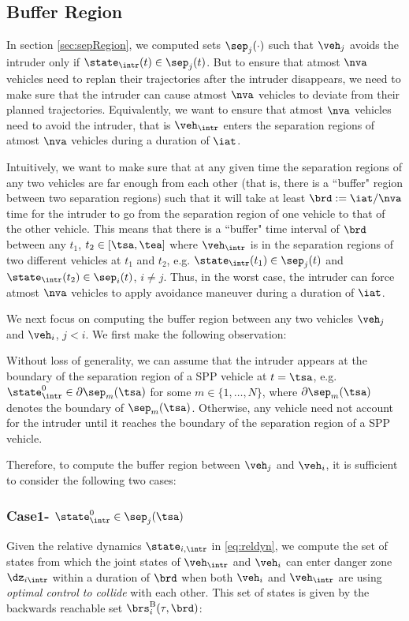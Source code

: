 \subsection{Buffer Region} \label{sec:buffRegion}
In section \ref{sec:sepRegion}, we computed sets $\sep_j(\cdot)$ such that $\veh_j$ avoids the intruder only if $\state_{\intr}(t) \in \sep_j(t)$. But to ensure that atmost $\nva$ vehicles need to replan their trajectories after the intruder disappears, we need to make sure that the intruder can cause atmost $\nva$ vehicles to deviate from their planned trajectories. Equivalently, we want to ensure that atmost $\nva$ vehicles need to avoid the intruder, that is $\veh_{\intr}$ enters the separation regions of atmost $\nva$ vehicles during a duration of $\iat$.

Intuitively, we want to make sure that at any given time the separation regions of any two vehicles are far enough from each other (that is, there is a ``buffer" region between two separation regions) such that it will take at least $\brd := \iat / \nva$ time for the intruder to go from the separation region of one vehicle to that of the other vehicle. This means that there is a ``buffer" time interval of $\brd$ between any $t_1$, $t_2 \in [\tsa, \tea]$ where $\veh_{\intr}$ is in the separation regions of two different vehicles at $t_1$ and $t_2$, e.g. $\state_{\intr}(t_1) \in \sep_j(t)$ and $\state_{\intr}(t_2) \in \sep_i(t)$, $i \neq j$. Thus, in the worst case, the intruder can force atmost $\nva$ vehicles to apply avoidance maneuver during a duration of $\iat$. 

We next focus on computing the buffer region between any two vehicles $\veh_j$ and $\veh_i$, $j < i$. We first make the following observation:
\begin{observation} \label{obs1_buffReg}
Without loss of generality, we can assume that the intruder appears at the boundary of the separation region of a SPP vehicle at $t = \tsa$, e.g. $\state_{\intr}^0 \in \partial \sep_m(\tsa)$ for some $m \in \{1, \ldots, N\}$, where $\partial \sep_m(\tsa)$ denotes the boundary of $\sep_m(\tsa)$. Otherwise, any vehicle need not account for the intruder until it reaches the boundary of the separation region of a SPP vehicle. 
\end{observation}
Therefore, to compute the buffer region between $\veh_j$ and $\veh_i$, it is sufficient to consider the following two cases:     
\subsubsection{Case1- $\state_{\intr}^0 \in \sep_j(\tsa)$} \label{sec:buffCase1}
Given the relative dynamics $\state_{i, \intr}$ in \eqref{eq:reldyn}, we compute the set of states from which the joint states of $\veh_{\intr}$ and $\veh_{i}$ can enter danger zone $\dz_{i\intr}$ within a duration of $\brd$ when both $\veh_{i}$ and $\veh_{\intr}$ are using \textit{optimal control to collide} with each other. This set of states is given by the backwards reachable set $\brs^{\text{B}}_i(\tau, \brd)$:

